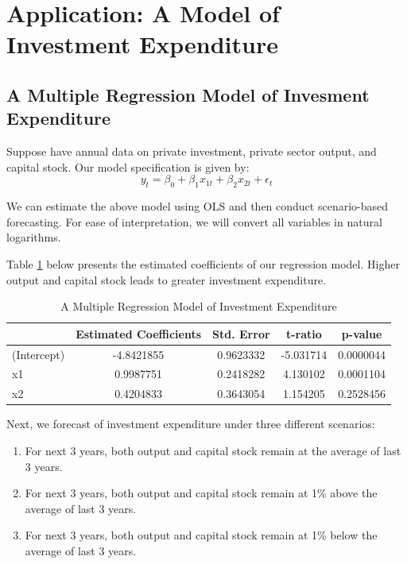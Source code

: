\documentclass[]{book}
\theoremstyle{definition}
\theoremstyle{definition}
\theoremstyle{definition}
\theoremstyle{remark}
\begin{document}
\hypertarget{application-a-model-of-investment-expenditure}{%
\section{Application: A Model of Investment
Expenditure}\label{application-a-model-of-investment-expenditure}}

\hypertarget{a-multiple-regression-model-of-invesment-expenditure}{%
\subsection{A Multiple Regression Model of Invesment
Expenditure}\label{a-multiple-regression-model-of-invesment-expenditure}}

Suppose have annual data on private investment, private sector output,
and capital stock. Our model specification is given by: \begin{equation}
y_t= \beta_0 + \beta_1 x_{1t}+ \beta_2 x_{2t}+\epsilon_t
\end{equation}

We can estimate the above model using OLS and then conduct
scenario-based forecasting. For ease of interpretation, we will convert
all variables in natural logarithms.

Table \ref{tab:ch2-table1} below presents the estimated coefficients of
our regression model. Higher output and capital stock leads to greater
investment expenditure.

\begin{table}

\caption{\label{tab:ch2-table1}A Multiple Regression Model of Investment Expenditure}
\centering
\begin{tabular}[t]{lcccc}
\toprule
  & Estimated Coefficients & Std. Error & t-ratio & p-value\\
\midrule
(Intercept) & -4.8421855 & 0.9623332 & -5.031714 & 0.0000044\\
x1 & 0.9987751 & 0.2418282 & 4.130102 & 0.0001104\\
x2 & 0.4204833 & 0.3643054 & 1.154205 & 0.2528456\\
\bottomrule
\end{tabular}
\end{table}

Next, we forecast of investment expenditure under three different
scenarios:

\begin{enumerate}
\def\labelenumi{\arabic{enumi}.}
\item
  For next 3 years, both output and capital stock remain at the average
  of last 3 years.
\item
  For next 3 years, both output and capital stock remain at 1\% above
  the average of last 3 years.
\item
  For next 3 years, both output and capital stock remain at 1\% below
  the average of last 3 years.
\end{enumerate}
\end{document}
